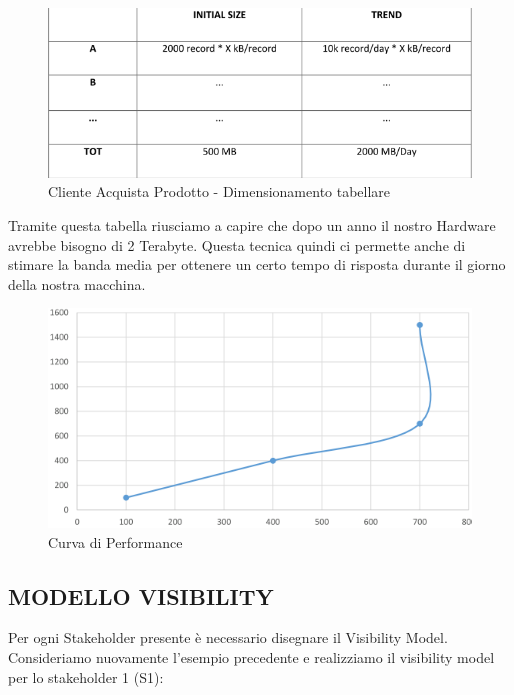 \begin{center}
\begin{figure}[H]
\centering
\includegraphics[scale=0.8]{figures/dimensioning_table.png}
\caption{Cliente Acquista Prodotto - Dimensionamento tabellare}
\end{figure}
\end{center}

Tramite questa tabella riusciamo a capire che dopo un anno il nostro Hardware avrebbe bisogno di 2 Terabyte. Questa tecnica quindi ci permette anche di stimare la banda media per ottenere un certo tempo di risposta durante il giorno della nostra macchina. 

\begin{center}
\begin{figure}[H]
\centering
\includegraphics[scale=1]{figures/performance_plot.png}
\caption{Curva di Performance}
\end{figure}
\end{center}


\subsection{MODELLO VISIBILITY}

Per ogni Stakeholder presente è necessario disegnare il Visibility Model. Consideriamo nuovamente l’esempio precedente e realizziamo il visibility model per lo stakeholder 1 (S1): 

